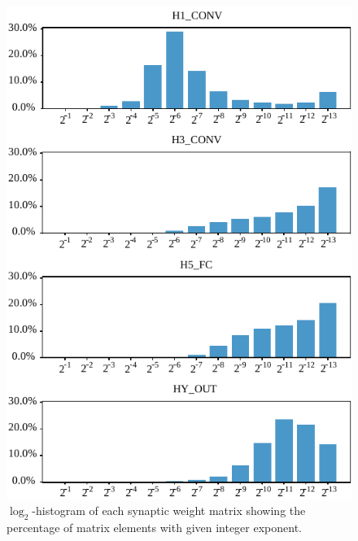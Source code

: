 \begin{figure}[h!]
	\includegraphics[width=\columnwidth]{../figures/log2_histogram.pdf}
	\caption{$\log_2$-histogram of each synaptic weight matrix showing the percentage of matrix elements with given integer exponent.}\label{fig:log2histogram}
\end{figure}

